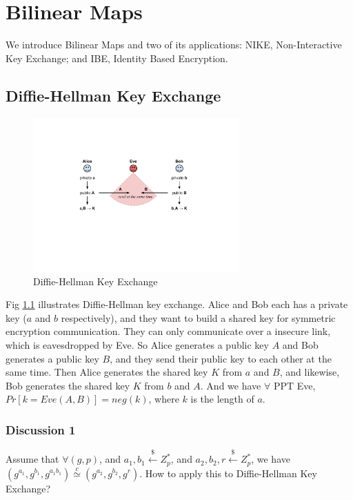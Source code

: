 \chapter{Bilinear Maps}

We introduce Bilinear Maps and two of its applications: NIKE, Non-Interactive Key Exchange; and IBE, Identity Based Encryption.


\section{Diffie-Hellman Key Exchange}

\begin{figure}[H]
\label{fig:dh}
\centering
  \includegraphics[width=0.7\textwidth]{fig1.pdf}
\caption{Diffie-Hellman Key Exchange}
\end{figure}


Fig \ref{fig:dh} illustrates Diffie-Hellman key exchange. Alice and Bob each has a private key ($a$ and $b$ respectively), and they want to build a shared key for symmetric encryption communication. They can only communicate over a insecure link, which is eavesdropped by Eve.
So Alice generates a public key $A$ and Bob generates a public key $B$, and they send their public key to each other at the same time. Then Alice generates the shared key $K$ from $a$ and $B$, and likewise, Bob generates the shared key $K$ from $b$ and $A$.
And we have $\forall$ PPT Eve, $Pr[k=Eve(A,B)]=neg(k)$, where $k$ is the length of $a$.


\subsection{Discussion 1}

Assume that $\forall (g, p)$, and $a_1,b_1 \stackrel{\$}{\gets} Z^*_p$, and $a_2,b_2,r \stackrel{\$}{\gets}Z^*_p$, we have $(g^{a_1}, g^{b_1}, g^{a_1b_1}) \stackrel{c}{\simeq} (g^{a_2}, g^{b_2}, g^r)$. How to apply this to Diffie-Hellman Key Exchange?


